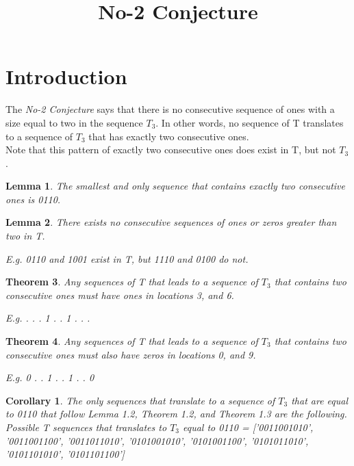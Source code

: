 \documentclass[12pt]{article}
\title{ No-2 Conjecture }
\newtheorem{theorem}{Theorem}[section]
\newtheorem{corollary}{Corollary}[theorem]
\newtheorem{lemma}[theorem]{Lemma}
\begin{document}
\maketitle

\section{Introduction}
The \textit{No-2 Conjecture} says that there is no consecutive sequence of ones with a size equal to two in the sequence $T_3$. In other words, no sequence of T translates to a sequence of $T_3$ that has exactly two consecutive ones.\\

Note that this pattern of exactly two consecutive ones does exist in T, but not $T_3$.

\begin{lemma}
The smallest and only sequence that contains exactly two consecutive ones is 0110.
\end{lemma}

\begin{lemma}
There exists no consecutive sequences of ones or zeros greater than two in T.

E.g. 0110 and 1001 exist in T, but 1110 and 0100 do not.
\end{lemma}

\begin{theorem}
Any sequences of T that leads to a sequence of $T_3$ that contains two consecutive ones must have ones in locations 3, and 6.

E.g. . . . 1 . . 1 . . .
\end{theorem}

\begin{theorem}
Any sequences of T that leads to a sequence of $T_3$ that contains two consecutive ones must also have zeros in locations 0, and 9.

E.g. 0 . . 1 . . 1 . . 0
\end{theorem}

\begin{corollary}
The only sequences that translate to a sequence of $T_3$ that are equal to 0110 that follow Lemma 1.2, Theorem 1.2, and Theorem 1.3 are the following. \\

Possible T sequences that translates to $T_3$ equal to 0110 = ['0011001010',
 '0011001100',
 '0011011010',
 '0101001010',
 '0101001100',
 '0101011010',
 '0101101010',
 '0101101100']

\end{corollary}
\end{document}
